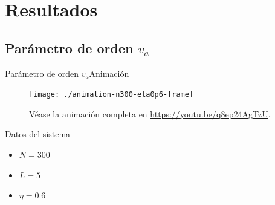 \documentclass{beamer}
\begin{document}
    \section{Resultados}

        \subsection{Parámetro de orden $v_a$}

            \begin{frame}{Parámetro de orden $v_a$}{Animación}
                \begin{minipage}[t]{0.60\textwidth}
                    \begin{figure}[H!]
                        \texttt{[image: ./animation-n300-eta0p6-frame]}
                        \caption*{Véase la animación completa en \url{https://youtu.be/q8ep24AgTzU}.}
                        \label{fig:va_1}
                    \end{figure}
                \end{minipage}
                \hfill
                \begin{minipage}[t]{0.30\textwidth}
                    \begin{block}{Datos del sistema}
                        \begin{itemize}
                            \item $N=300$
                            \item $L=5$
                            \item $\eta=0.6$
                        \end{itemize}
                    \end{block}
                \end{minipage}
            \end{frame}
\end{document}
